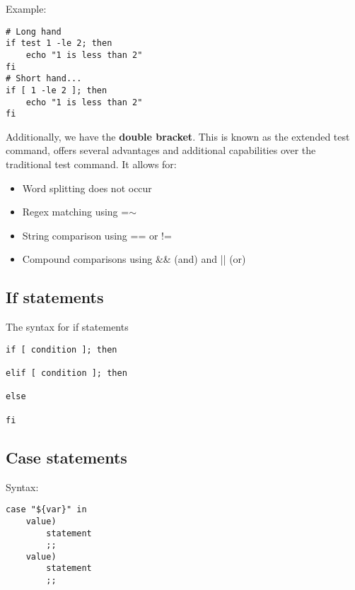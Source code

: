 \documentclass{report}
\begin{document}
    \bigbreak \noindent 
    Example:
    \begin{mdframed}[style=purplebox]
    \begin{verbatim}
# Long hand
if test 1 -le 2; then
    echo "1 is less than 2"
fi
# Short hand...
if [ 1 -le 2 ]; then 
    echo "1 is less than 2"
fi
    \end{verbatim}
    \bigbreak \noindent
    \end{mdframed}
    \bigbreak \noindent 
    Additionally, we have the \textbf{double bracket}. This is known as the extended test command, offers several advantages and additional capabilities over the traditional test command. It allows for:
    \bigbreak \noindent 
    \begin{itemize}
        \item Word splitting does not occur
        \item Regex matching using =$\sim$
        \item String comparison using == or !=
        \item Compound comparisons using \&\& (and) and || (or)
    \end{itemize}

    \bigbreak \noindent 
    \subsection{If statements}
    The syntax for if statements
    \bigbreak \noindent 
    \begin{mdframed}[style=purplebox]
    \begin{verbatim}
if [ condition ]; then 

elif [ condition ]; then

else 

fi
    \end{verbatim}
    \bigbreak \noindent
    \end{mdframed}

    \pagebreak \bigbreak \noindent 
    \subsection{Case statements}
    \bigbreak \noindent 
    Syntax:
    \begin{mdframed}[style=purplebox]
    \begin{verbatim}
case "${var}" in 
    value)
        statement
        ;;
    value)
        statement
        ;;
    \end{verbatim}
    \bigbreak \noindent
    \end{mdframed}
    \bigbreak \noindent 
\end{document}
